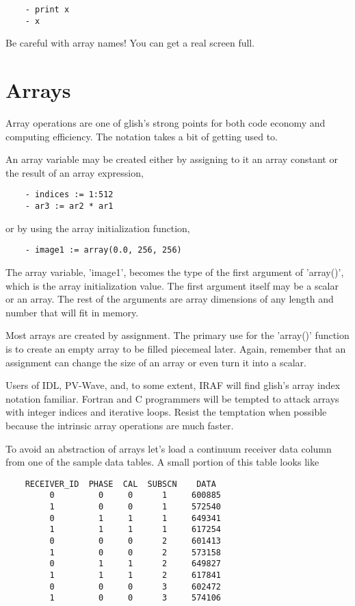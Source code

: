 \begin{verbatim}
	- print x
	- x
\end{verbatim}

Be careful with array names!  You can get a real screen full.

\section{Arrays}

    Array operations are one of glish's strong points for both code economy
and computing efficiency.  The notation takes a bit of getting used to.

    An array variable may be created either by assigning to it an array
constant or the result of an array expression,

\begin{verbatim}
	- indices := 1:512
	- ar3 := ar2 * ar1
\end{verbatim}

or by using the array initialization function,

\begin{verbatim}
	- image1 := array(0.0, 256, 256)
\end{verbatim}

The array variable, 'image1', becomes the type of the first argument of
'array()', which is the array initialization value.  The first argument
itself may be a scalar or an array.  The rest of the arguments are array
dimensions of any length and number that will fit in memory.

    Most arrays are created by assignment.  The primary use for the
'array()' function is to create an empty array to be filled piecemeal
later.  Again, remember that an assignment can change the size of an array
or even turn it into a scalar.

    Users of IDL, PV-Wave, and, to some extent, IRAF will find glish's
array index notation familiar.  Fortran and C programmers will be tempted
to attack arrays with integer indices and iterative loops.  Resist the
temptation when possible because the intrinsic array operations are much
faster.

    To avoid an abstraction of arrays let's load a continuum receiver data
column from one of the sample data tables.  A small portion of this table
looks like

\begin{verbatim}
	RECEIVER_ID  PHASE  CAL  SUBSCN    DATA
	     0         0     0      1     600885
	     1         0     0      1     572540
	     0         1     1      1     649341
	     1         1     1      1     617254
	     0         0     0      2     601413
	     1         0     0      2     573158
	     0         1     1      2     649827
	     1         1     1      2     617841
	     0         0     0      3     602472
	     1         0     0      3     574106
\end{verbatim}


